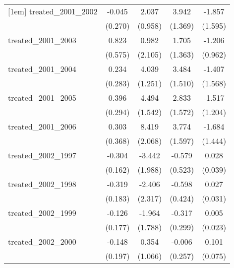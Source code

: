 {\begin{tabular}{l*{4}{c}}
[1em]
treated\_2001\_2002&      -0.045         &       2.037\sym{*}  &       3.942\sym{**} &      -1.857         \\
            &     (0.270)         &     (0.958)         &     (1.369)         &     (1.595)         \\
[1em]
treated\_2001\_2003&       0.823         &       0.982         &       1.705         &      -1.206         \\
            &     (0.575)         &     (2.105)         &     (1.363)         &     (0.962)         \\
[1em]
treated\_2001\_2004&       0.234         &       4.039\sym{**} &       3.484\sym{*}  &      -1.407         \\
            &     (0.283)         &     (1.251)         &     (1.510)         &     (1.568)         \\
[1em]
treated\_2001\_2005&       0.396         &       4.494\sym{**} &       2.833         &      -1.517         \\
            &     (0.294)         &     (1.542)         &     (1.572)         &     (1.204)         \\
[1em]
treated\_2001\_2006&       0.303         &       8.419\sym{***}&       3.774\sym{*}  &      -1.684         \\
            &     (0.368)         &     (2.068)         &     (1.597)         &     (1.444)         \\
[1em]
treated\_2002\_1997&      -0.304         &      -3.442         &      -0.579         &       0.028         \\
            &     (0.162)         &     (1.988)         &     (0.523)         &     (0.039)         \\
[1em]
treated\_2002\_1998&      -0.319         &      -2.406         &      -0.598         &       0.027         \\
            &     (0.183)         &     (2.317)         &     (0.424)         &     (0.031)         \\
[1em]
treated\_2002\_1999&      -0.126         &      -1.964         &      -0.317         &       0.005         \\
            &     (0.177)         &     (1.788)         &     (0.299)         &     (0.023)         \\
[1em]
treated\_2002\_2000&      -0.148         &       0.354         &      -0.006         &       0.101         \\
            &     (0.197)         &     (1.066)         &     (0.257)         &     (0.075)         \\

\end{tabular}}

